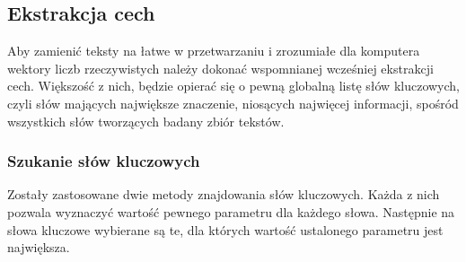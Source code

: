 \documentclass{classrep}
\begin{document}
{        \subsection{Ekstrakcja cech} {
            Aby zamienić teksty na łatwe w przetwarzaniu i zrozumiałe dla komputera wektory liczb rzeczywistych
            należy dokonać wspomnianej wcześniej ekstrakcji cech. Większość z nich, będzie opierać się o pewną
            globalną listę słów kluczowych, czyli słów mających największe znaczenie, niosących najwięcej informacji,
            spośród wszystkich słów tworzących badany zbiór tekstów.

            \subsubsection{Szukanie słów kluczowych} \label{keywords}{
                Zostały zastosowane dwie metody znajdowania słów kluczowych. Każda z nich pozwala wyznaczyć wartość
                pewnego parametru dla każdego słowa. Następnie na słowa kluczowe wybierane są te, dla których wartość
                ustalonego parametru jest największa.

}}}
\end{document}
